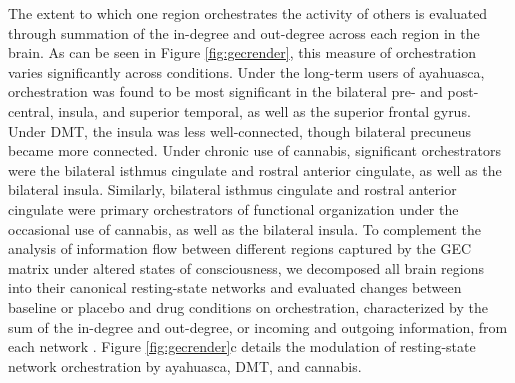 The extent to which one region orchestrates the activity of others is
evaluated through summation of the in-degree and out-degree across each region in the brain. As can be seen in Figure \ref{fig:gecrender}, this measure of orchestration varies significantly across conditions. Under the long-term users of ayahuasca, orchestration was found to be most significant in the bilateral pre- and post-central, insula, and superior temporal, as well as the superior frontal gyrus. Under DMT, the insula was less well-connected, though bilateral precuneus became more connected. Under chronic use of cannabis, significant orchestrators were the bilateral isthmus cingulate and rostral anterior cingulate, as well as the bilateral insula. Similarly, bilateral isthmus cingulate and rostral anterior cingulate were primary orchestrators of functional organization under the occasional use of cannabis, as well as the bilateral insula. To complement the analysis of information flow between different regions
captured by the GEC matrix under altered states of consciousness, we
decomposed all brain regions into their canonical resting-state networks
and evaluated changes between baseline or placebo and
drug conditions on orchestration, characterized by the sum of
the in-degree and out-degree, or incoming and outgoing information, from
each network \parencite{Yeo2011}. Figure \ref{fig:gecrender}c details the modulation of
resting-state network orchestration by ayahuasca, DMT, and cannabis.

